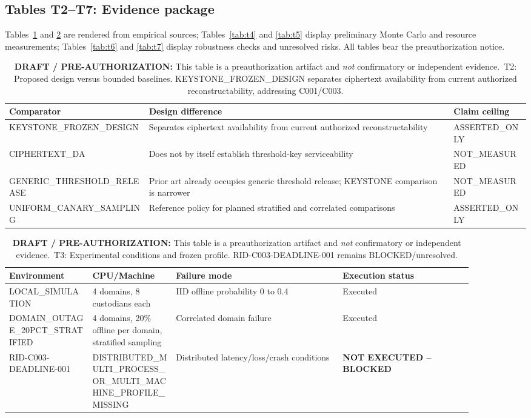 \documentclass[10pt]{article}
\newcommand{\KeystoneDraftTableNotice}{\textbf{DRAFT / PRE-AUTHORIZATION:} This table is a preauthorization artifact and \textit{not} confirmatory or independent evidence.}
\begin{document}
\subsection{Tables T2--T7: Evidence package}

Tables~\ref{tab:t2} and \ref{tab:t3} are rendered from empirical sources; Tables~\ref{tab:t4} and \ref{tab:t5} display preliminary Monte Carlo and resource measurements; Tables~\ref{tab:t6} and \ref{tab:t7} display robustness checks and unresolved risks. All tables bear the preauthorization notice.

\begin{table}[h]
\centering
\caption{\KeystoneDraftTableNotice\ \newline T2: Proposed design versus bounded baselines. KEYSTONE_FROZEN_DESIGN separates ciphertext availability from current authorized reconstructability, addressing C001/C003.}
\label{tab:t2}
\small
\begin{tabularx}{\textwidth}{@{}lXl@{}}
\toprule
Comparator & Design difference & Claim ceiling \\
\midrule
KEYSTONE\_FROZEN\_DESIGN & Separates ciphertext availability from current authorized reconstructability & ASSERTED\_ONLY\\
CIPHERTEXT\_DA & Does not by itself establish threshold-key serviceability & NOT\_MEASURED\\
GENERIC\_THRESHOLD\_RELEASE & Prior art already occupies generic threshold release; KEYSTONE comparison is narrower & NOT\_MEASURED\\
UNIFORM\_CANARY\_SAMPLING & Reference policy for planned stratified and correlated comparisons & ASSERTED\_ONLY\\
\bottomrule
\end{tabularx}
\end{table}

\begin{table}[h]
\centering
\caption{\KeystoneDraftTableNotice\ \newline T3: Experimental conditions and frozen profile. RID-C003-DEADLINE-001 remains BLOCKED/unresolved.}
\label{tab:t3}
\small
\begin{tabularx}{\textwidth}{@{}p{0.16\linewidth}p{0.16\linewidth}p{0.32\linewidth}p{0.25\linewidth}@{}}
\toprule
Environment & CPU/Machine & Failure mode & Execution status \\
\midrule
LOCAL\_SIMULATION & 4 domains, 8 custodians each & IID offline probability 0 to 0.4 & Executed \\
DOMAIN\_OUTAGE\_20PCT\_STRATIFIED & 4 domains, 20\% offline per domain, stratified sampling & Correlated domain failure & Executed \\
RID-C003-DEADLINE-001 & DISTRIBUTED\_MULTI\_PROCESS\_OR\_MULTI\_MACHINE\+\_\+PROFILE\_MISSING & Distributed latency/loss/crash conditions & \textbf{NOT EXECUTED -- BLOCKED} \\
\bottomrule
\end{tabularx}
\end{table}
\end{document}
